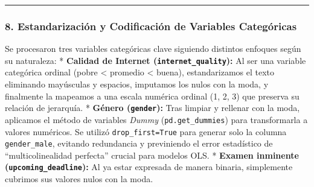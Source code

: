 \documentclass[11pt]{article}
\begin{document}
    \begin{center}\rule{0.5\linewidth}{0.5pt}\end{center}

\subsubsection{8. Estandarización y Codificación de Variables
Categóricas}\label{estandarizaciuxf3n-y-codificaciuxf3n-de-variables-categuxf3ricas}

Se procesaron tres variables categóricas clave siguiendo distintos
enfoques según su naturaleza: * \textbf{Calidad de Internet
(\texttt{internet\_quality}):} Al ser una variable categórica ordinal
(pobre \textless{} promedio \textless{} buena), estandarizamos el texto
eliminando mayúsculas y espacios, imputamos los nulos con la moda, y
finalmente la mapeamos a una escala numérica ordinal (1, 2, 3) que
preserva su relación de jerarquía. * \textbf{Género (\texttt{gender}):}
Tras limpiar y rellenar con la moda, aplicamos el método de variables
\emph{Dummy} (\texttt{pd.get\_dummies}) para transformarla a valores
numéricos. Se utilizó \texttt{drop\_first=True} para generar solo la
columna \texttt{gender\_male}, evitando redundancia y previniendo el
error estadístico de ``multicolinealidad perfecta'' crucial para modelos
OLS. * \textbf{Examen inminente (\texttt{upcoming\_deadline}):} Al ya
estar expresada de manera binaria, simplemente cubrimos sus valores
nulos con la moda.
\end{document}
